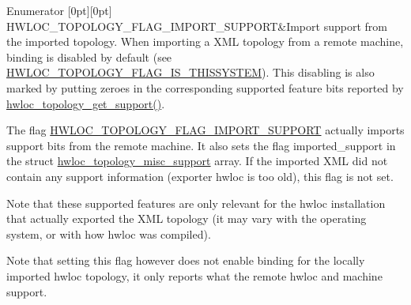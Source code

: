 \begin{DoxyEnumFields}{Enumerator}
[0pt][0pt]{}\mbox{\label{a00193_ggada025d3ec20b4b420f8038d23d6e7bdead93e82b8668ee90e4f9354e201a2ed9c}} 
H\+W\+L\+O\+C\+\_\+\+T\+O\+P\+O\+L\+O\+G\+Y\+\_\+\+F\+L\+A\+G\+\_\+\+I\+M\+P\+O\+R\+T\+\_\+\+S\+U\+P\+P\+O\+RT&Import support from the imported topology. When importing a X\+ML topology from a remote machine, binding is disabled by default (see \hyperlink{a00193_ggada025d3ec20b4b420f8038d23d6e7bdea6ecb6abc6a0bb75e81564f8bca85783b}{H\+W\+L\+O\+C\+\_\+\+T\+O\+P\+O\+L\+O\+G\+Y\+\_\+\+F\+L\+A\+G\+\_\+\+I\+S\+\_\+\+T\+H\+I\+S\+S\+Y\+S\+T\+EM}). This disabling is also marked by putting zeroes in the corresponding supported feature bits reported by \hyperlink{a00193_gab8c76173c4a8ce1a9a9366012b1388e6}{hwloc\+\_\+topology\+\_\+get\+\_\+support()}.

The flag \hyperlink{a00193_ggada025d3ec20b4b420f8038d23d6e7bdead93e82b8668ee90e4f9354e201a2ed9c}{H\+W\+L\+O\+C\+\_\+\+T\+O\+P\+O\+L\+O\+G\+Y\+\_\+\+F\+L\+A\+G\+\_\+\+I\+M\+P\+O\+R\+T\+\_\+\+S\+U\+P\+P\+O\+RT} actually imports support bits from the remote machine. It also sets the flag {\ttfamily imported\+\_\+support} in the struct \hyperlink{a00302}{hwloc\+\_\+topology\+\_\+misc\+\_\+support} array. If the imported X\+ML did not contain any support information (exporter hwloc is too old), this flag is not set.

Note that these supported features are only relevant for the hwloc installation that actually exported the X\+ML topology (it may vary with the operating system, or with how hwloc was compiled).

Note that setting this flag however does not enable binding for the locally imported hwloc topology, it only reports what the remote hwloc and machine support. \\
\hline

\end{DoxyEnumFields}
\mbox{\label{a00193_ga9a5a1f0140cd1952544477833733195b}} 
